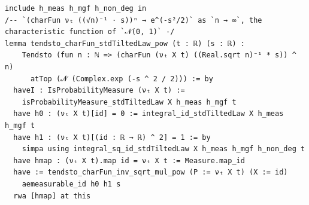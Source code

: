 \begin{lstlisting}
include h_meas h_mgf h_non_deg in
/-- `(charFun νₜ ((√n)⁻¹ · s))ⁿ → e^(-s²/2)` as `n → ∞`, the characteristic function of `𝒩(0, 1)` -/
lemma tendsto_charFun_stdTiltedLaw_pow (t : ℝ) (s : ℝ) :
    Tendsto (fun n : ℕ => (charFun (νₜ X t) ((Real.sqrt n)⁻¹ * s)) ^ n)
      atTop (𝓝 (Complex.exp (-s ^ 2 / 2))) := by
  haveI : IsProbabilityMeasure (νₜ X t) :=
    isProbabilityMeasure_stdTiltedLaw X h_meas h_mgf t
  have h0 : (νₜ X t)[id] = 0 := integral_id_stdTiltedLaw X h_meas h_mgf t
  have h1 : (νₜ X t)[(id : ℝ → ℝ) ^ 2] = 1 := by
    simpa using integral_sq_id_stdTiltedLaw X h_meas h_mgf h_non_deg t
  have hmap : (νₜ X t).map id = νₜ X t := Measure.map_id
  have := tendsto_charFun_inv_sqrt_mul_pow (P := νₜ X t) (X := id)
    aemeasurable_id h0 h1 s
  rwa [hmap] at this

\end{lstlisting}
\newpage
